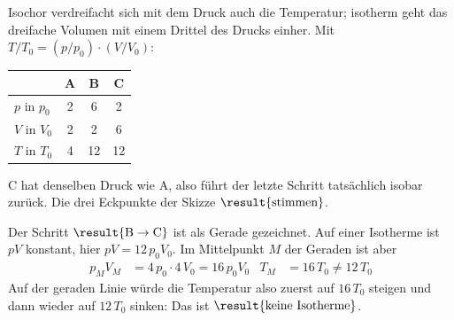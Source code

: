 \begin{abcliste}
\abc Isochor verdreifacht sich mit dem Druck auch die Temperatur; isotherm geht das dreifache Volumen mit einem Drittel des Drucks einher. Mit $T/T_0 = (p/p_0)\cdot(V/V_0)$:
\begin{center}
\begin{tabular}{lccc}
 & A & B & C \\ \hline
 $p$ in $p_0$ & 2 & 6 & 2 \\
 $V$ in $V_0$ & 2 & 2 & 6 \\
 $T$ in $T_0$ & 4 & 12 & 12
\end{tabular}
\end{center}
C hat denselben Druck wie A, also führt der letzte Schritt tatsächlich isobar zurück. Die drei Eckpunkte der Skizze $\result{\text{stimmen}}$.

\abc Der Schritt $\result{\text{B} \to \text{C}}$ ist als Gerade gezeichnet. Auf einer Isotherme ist $pV$ konstant, hier $pV = 12\,p_0V_0$. Im Mittelpunkt $M$ der Geraden ist aber
\begin{align}
 p_M V_M &= 4\,p_0\cdot 4\,V_0 = 16\,p_0V_0 & T_M &= 16\,T_0 \neq 12\,T_0
\end{align}
Auf der geraden Linie würde die Temperatur also zuerst auf $16\,T_0$ steigen und dann wieder auf $12\,T_0$ sinken: Das ist $\result{\text{keine Isotherme}}$.


\end{abcliste}

